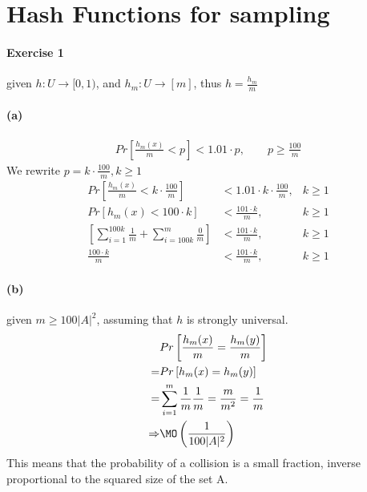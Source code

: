 \section{Hash Functions for sampling}

\paragraph{Exercise 1}
given $h: U \rightarrow [0,1)$, and $h_m: U \rightarrow [m]$, thus $h = \frac{h_m}{m}$

\paragraph*{(a)}
\begin{align*}
Pr \left[ \frac{h_m(x)}{m} < p\right] < 1.01 \cdot p, \qquad p \geq \frac{100}{m}
\end{align*}
We rewrite $p = k \cdot \frac{100}{m}, k \geq 1$
\begin{align*}
Pr \left[ \frac{h_m(x)}{m} < k \cdot \frac{100}{m} \right] &< 1.01 \cdot k \cdot \frac{100}{m}, &k \geq 1 \\
Pr \left[ h_m(x) < 100 \cdot k \right] &< \frac{101 \cdot k}{m}, &k \geq 1 \\
\left[ \sum_{i=1}^{100 k} \frac{1}{m} + \sum_{i=100k}^{m} \frac{0}{m} \right] &< \frac{101 \cdot k}{m}, &k \geq 1 \\
\frac{100 \cdot k}{m} &< \frac{101 \cdot k}{m}, &k \geq 1
\end{align*}

\paragraph*{(b)} given $m \geq 100 |A|^2$, assuming that $h$ is strongly universal.
\begin{align*}
&Pr \left[ \frac{h_m(x)}{m} = \frac{h_m(y)}{m} \right] \\
=& Pr \left[ h_m(x) = h_m(y) \right] \\
=& \sum_{i=1}^m \frac{1}{m} \frac{1}{m} = \frac{m}{m^2} = \frac{1}{m} \\
\Rightarrow& \MO \left( \frac{1}{100 |A|^2} \right)
\end{align*}
This means that the probability of a collision is a small fraction, inverse proportional to the squared size of the set A.


